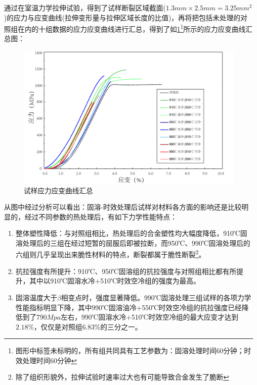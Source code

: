 通过在室温力学拉伸试验，得到了试样断裂区域截面($ 1.3mm\times2.5mm=3.25mm^2 $)的应力与应变曲线(拉伸变形量与拉伸区域长度的比值)，再将把包括未处理的对照组在内的十组数据的应力应变曲线进行汇总，得到了如\ref{fig:试样应力应变曲线汇总}\footnote{图形中标签未标明的，所有组共同具有工艺参数为：固溶处理时间60分钟；时效处理时间60分钟}所示的应力应变曲线汇总图：
\begin{figure}[h!]
	\centering
	\includegraphics[width=0.99\linewidth]{pic/试样应力应变曲线汇总min.png}
	\caption{试样应力应变曲线汇总}
	\label{fig:试样应力应变曲线汇总}
\end{figure}


从图中经过分析可以看出：固溶-时效处理后试样对材料各方面的影响还是比较明显的，经过不同参数的热处理后，有如下力学性能特点：
\begin{enumerate}
	\item {整体塑性降低：}与对照组相比，热处理后的合金塑性均大幅度降低，910℃固溶处理后的三组在经过短暂的屈服后即被拉断，而950℃、990℃固溶处理后的六组则几乎呈现出来脆性材料的特点，断裂都属于脆性断裂\footnote{除了组织形貌外，拉伸试验时速率过大也有可能导致合金发生了脆断}。
	\item {抗拉强度有所提升：}910℃、950℃固溶组的抗拉强度与对照组相比都有所提升，其中以910℃固溶水冷+510℃时效空冷组的强度为最高。
	\item {固溶温度大于$\beta$相变点时，强度显著降低。}990℃固溶处理三组试样的各项力学性能指标明显下降，其中990℃固溶油冷+550℃时效空冷组的抗拉强度已经降低到了$ 790Mpa $左右，990℃固溶水冷+510℃时效空冷组的最大应变才达到$ 2.18\% $，仅仅是对照组$ 6.83\% $的三分之一。
\end{enumerate}
